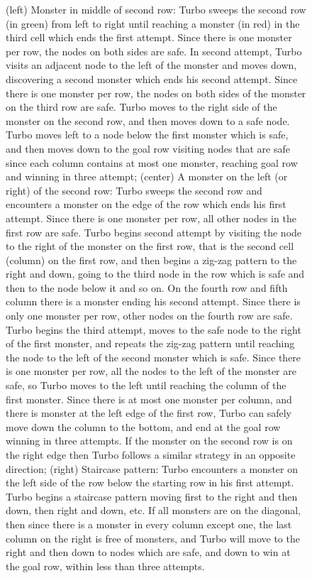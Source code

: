 \begin{figure}[H]
{    (left) Monster in middle of second row: Turbo sweeps the second row (in green) from left to right until reaching a monster (in red) in the third cell which ends the first attempt. Since there is one monster per row, the nodes on both sides are safe. In second attempt, Turbo visits an adjacent node to the left of the monster and moves down, discovering a second monster which ends his second attempt. Since there is one monster per row, the nodes on both sides of the monster on the third row are safe. Turbo moves to the right side of the monster on the second row, and then moves down to a safe node. Turbo moves left to a node below the first monster which is safe, and then moves down to the goal row visiting nodes that are safe since each column contains at most one monster, reaching goal row and winning in three attempt; (center) A monster on the left (or right) of the second row: Turbo sweeps the second row and encounters a monster on the edge of the row which ends his first attempt. Since there is one monster per row, all other nodes in the first row are safe. Turbo begins second attempt by visiting the node to the right of the monster on the first row, that is the second cell (column) on the first row, and then begins a zig-zag pattern to the right and down, going to the third node in the row which is safe and then to the node below it and so on. On the fourth row and fifth column there is a monster ending his second attempt. Since there is only one monster per row, other nodes on the fourth row are safe. Turbo begins the third attempt, moves to the safe node to the right of the first monster, and repeats the zig-zag pattern until reaching the node to the left of the second monster which is safe. Since there is one monster per row, all the nodes to the left of the monster are safe, so Turbo moves to the left until reaching the column of the first monster. Since there is at most one monster per column, and there is monster at the left edge of the first row, Turbo can safely move down the column to the bottom, and end at the goal row winning in three attempts. If the monster on the second row is on the right edge then Turbo follows a similar strategy in an opposite direction; (right) Staircase pattern: Turbo encounters a monster on the left side of the row below the starting row in his first attempt. Turbo begins a staircase pattern moving first to the right and then down, then right and down, etc. If all monsters are on the diagonal, then since there is a monster in every column except one, the last column on the right is free of monsters, and Turbo will move to the right and then down to nodes which are safe, and down to win at the goal row, within less than three attempts.
  }
  \label{fig:problem5}
\end{figure}


